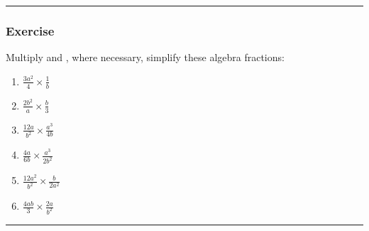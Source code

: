 \documentclass[a4paper,12pt]{article}
\newcommand\question{
	 \rule[0pt]{17cm}{0.5pt}\vspace{-0.5cm}
	\subsubsection{Exercise}

}
\newcommand\questionend{
	\rule[0pt]{17cm}{0.5pt}\vspace{0.0cm}\\
}
\begin{document}
\setlength{\columnsep}{1cm}
\question
Multiply and , where necessary, simplify these algebra fractions:\\
\begin{multicols}{3}
	\begin{enumerate}[label=\normalsize \alph*)~~~ , topsep=8pt,itemsep=25pt,partopsep=4pt, parsep=4pt]
		\item $\displaystyle \frac{3a^2}{4} \times \frac{1}{b}$
		\item $\displaystyle  \frac{2b^2}{a} \times \frac{b}{3}$
		\item $\displaystyle \frac{12a}{b^2} \times \frac{a^3}{4b}$
		\item $\displaystyle \frac{4a}{6b} \times \frac{a^3}{2b^2}$
		\item $\displaystyle \frac{12a^2}{b^2} \times \frac{b}{2a^2}$
		\item$\displaystyle \frac{4ab}{3} \times \frac{2a}{b^2}$
	\end{enumerate}
\end{multicols}\vspace{0.5cm}
\questionend


\newpage
\end{document}
